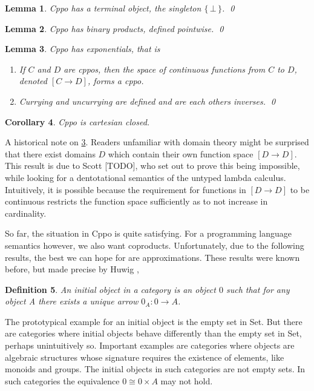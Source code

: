 \documentclass[a4paper]{article}
\newcommand{\arr}{\rightarrow}
\newcommand{\set}[1]{\{\,#1\,\}}
\newcommand{\product}{\!\times\!}
\newtheorem{definition}{Definition}[section]
\newtheorem{lemma}[definition]{Lemma}
\newtheorem{corollary}[definition]{Corollary}
\begin{document}
\begin{lemma} \label{lemCppoTerminalObject}
Cppo has a terminal object, the singleton $\set{\bot}$. \qed
\end{lemma}

\begin{lemma} \label{lemCppoBinaryProducts}
Cppo has binary products, defined pointwise. \qed
\end{lemma}

\begin{lemma} \label{lemCppoExponentials}
Cppo has exponentials, that is
\begin{enumerate}[noitemsep]
  \item If $C$ and $D$ are cppos, then the space of continuous functions from
  $C$ to $D$, denoted $[C \arr D]$, forms a cppo.
  \item Currying and uncurrying are defined and are each others inverses. \qed
\end{enumerate}
\end{lemma}

\begin{corollary}
Cppo is cartesian closed.
\end{corollary}

A historical note on \ref{lemCppoExponentials}. Readers unfamiliar with domain
theory might be surprised that there exist domains $D$ which contain their own
function space $[D \arr D]$.  This result is due to Scott [TODO], who set out to
prove this being impossible, while looking for a dentotational semantics of
the untyped lambda calculus. Intuitively, it is possible because the
requirement for functions in $[D \arr D]$ to be continuous restricts the
function space sufficiently as to not increase in cardinality.

So far, the situation in Cppo is quite satisfying. For a programming language
semantics however, we also want coproducts. Unfortunately, due to the following
results, the best we can hope for are approximations.  These results were known
before, but made precise by Huwig \cite{Huwig1990},

\begin{definition}
An \emph{initial object} in a category is an object $0$ such that for any object
A there exists a unique arrow $0_A : 0 \arr A$.
\end{definition}

The prototypical example for an initial object is the empty set in Set. But
there are categories where initial objects behave differently than the empty set
in Set, perhaps unintuitively so. Important examples are categories where
objects are algebraic structures whose signature requires the existence of
elements, like monoids and groups. The initial objects in such categories are
not empty sets. In such categories the equivalence $0 \cong 0 \product A$ may
not hold.
\end{document}
